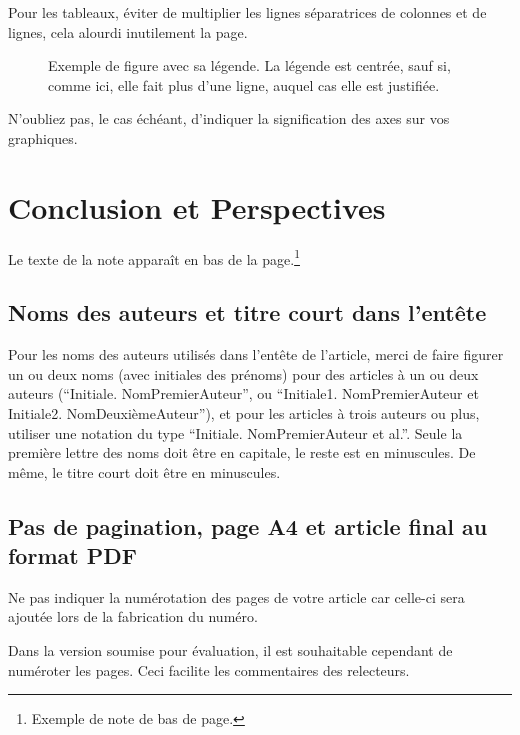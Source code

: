\documentclass[a4paper,pagenum,french,showlayout]{rnti}
\begin{document}
Pour les tableaux, éviter de multiplier les lignes séparatrices de
colonnes et de lignes, cela alourdi inutilement la page.


\begin{figure}[t]
\begin{center}
 \caption{Exemple de figure avec sa légende. La légende est centrée,
sauf si, comme ici, elle fait plus d'une ligne, auquel cas elle est
justifiée.} \label{fig_exemple}
\end{center}
\end{figure}

N'oubliez pas, le cas échéant, d'indiquer la signification des axes
sur vos graphiques.


\section{Conclusion et Perspectives}

Le texte de la note apparaît en bas de la page.\footnote{Exemple de
note de bas de page.}

\subsection{Noms des auteurs et titre court dans l'entête}

Pour les noms des auteurs utilisés dans l'entête de l'article, merci
de faire figurer un ou deux noms (avec initiales des prénoms) pour
des articles à un ou deux auteurs (``Initiale. NomPremierAuteur'',
ou ``Initiale1. NomPremierAuteur et Initiale2. NomDeuxièmeAuteur''),
et pour les articles à trois auteurs ou plus, utiliser une notation
du type ``Initiale. NomPremierAuteur et al.''. Seule la première
lettre des noms doit être en capitale, le reste est en minuscules.
De même, le titre court doit être en minuscules.



\subsection{Pas de pagination, page A4 et article final au format PDF}

Ne pas indiquer la numérotation des pages de votre article car
celle-ci sera ajoutée lors de la fabrication du numéro.

Dans la version soumise pour évaluation, il est souhaitable
cependant de numéroter les pages. Ceci facilite les commentaires des
relecteurs.
\end{document}
